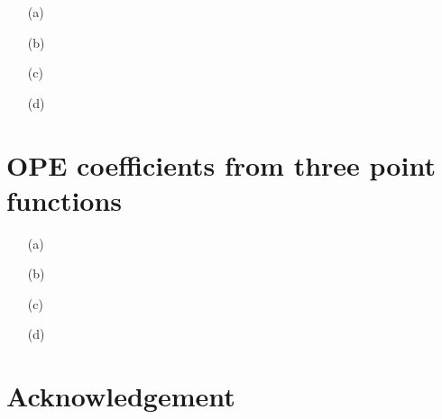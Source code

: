 \documentclass[10pt, a4paper]{article}
\begin{document}
{\begin{enumerate}
  \item[(a)]
  \item[(b)] 
  \item[(c)]
  \item[(d)] 
\end{enumerate}

\section{OPE coefficients from three point functions}

\begin{enumerate}
  \item[(a)]
  \item[(b)] 
  \item[(c)]
  \item[(d)] 
\end{enumerate}


\section{Acknowledgement}


}

\makereferences


\end{document}

